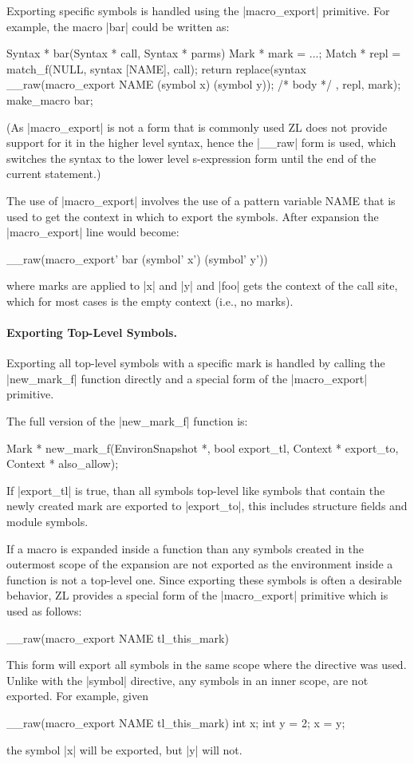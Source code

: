 Exporting specific symbols is handled using the |macro_export|
primitive.  For example, the macro |bar| could be written as:
\begin{code}
Syntax * bar(Syntax * call, Syntax * parms) {
   Mark * mark = ...;
   Match * repl = match_f(NULL, syntax [NAME], call);
   return replace(syntax {
     __raw(macro_export NAME (symbol x) (symbol y));
     /* body */
   }, repl, mark);
}
make_macro bar;
\end{code}
(As |macro_export| is not a form that is commonly used ZL does not
provide support for it in the higher level syntax, hence the |__raw|
form is used, which switches the syntax to the lower level
s-expression form until the end of the current statement.)

The use of |macro_export| involves the use of a pattern variable NAME
that is used to get the context in which to export the symbols.
After expansion the |macro_export| line would become:
\begin{code}
__raw(macro_export' bar (symbol' x') (symbol' y')) 
\end{code}
where marks are applied to |x| and |y| and |foo| gets the context of
the call site, which for most cases is the empty context (i.e., no
marks).

\paragraph{Exporting Top-Level Symbols.} 

Exporting all top-level symbols with a specific mark is handled by
calling the |new_mark_f| function directly and a special form of the
|macro_export| primitive.

The full version of the |new_mark_f| function is:
\begin{code}
Mark * new_mark_f(EnvironSnapshot *, bool export_tl, 
                  Context * export_to, Context * also_allow);
\end{code}
If |export_tl| is true, than all symbols top-level like symbols that
contain the newly created mark are exported to |export_to|, this
includes structure fields and module symbols.

If a macro is expanded inside a function than any symbols created in
the outermost scope of the expansion are not exported as the environment
inside a function is not a top-level one.  Since exporting these
symbols is often a desirable behavior, ZL provides a special form of
the |macro_export| primitive which is used as follows:
\begin{code}
__raw(macro_export NAME tl_this_mark)
\end{code}
This form will export all symbols in the same scope where the
directive was used.  Unlike with the |symbol| directive, any symbols
in an inner scope, are not exported.  For example, given
\begin{code}
__raw(macro_export NAME tl_this_mark)
int x;
{
  int y = 2;
  x = y;
}
\end{code}
the symbol |x| will be exported, but |y| will not.

